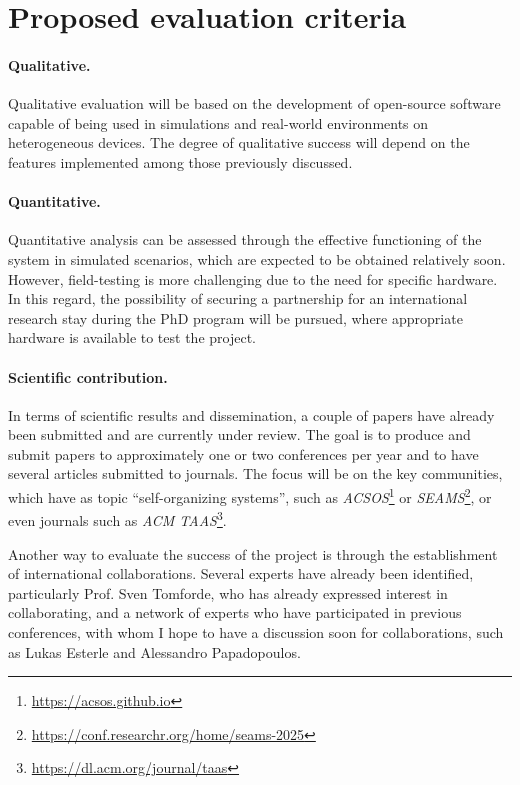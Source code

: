 \documentclass[12pt, a4paper]{article}
\begin{document}
\section{Proposed evaluation criteria}
\label{sec:proposed-evaluation-criteria}

\sloppypar
\paragraph{Qualitative.}
Qualitative evaluation will be based on the development of open-source software capable of being used in simulations and real-world
environments on heterogeneous devices.
%
The degree of qualitative success will depend on the features implemented among those previously discussed.

\sloppypar
\paragraph{Quantitative.}
Quantitative analysis can be assessed through the effective functioning of the system in simulated scenarios,
which are expected to be obtained relatively soon.
%
However,
field-testing is more challenging due to the need for specific hardware.
%
In this regard,
the possibility of securing a partnership for an international research stay during the PhD program will be pursued,
where appropriate hardware is available to test the project.

\sloppypar
\paragraph{Scientific contribution.}
In terms of scientific results and dissemination,
a couple of papers have already been submitted and are currently under review.
%
The goal is to produce and submit papers to approximately one or two conferences per year and to have several articles submitted to journals.
%
The focus will be on the key communities, which have as topic ``self-organizing systems'',
such as \emph{ACSOS}\footnote{\url{https://acsos.github.io}} or \emph{SEAMS}\footnote{\url{https://conf.researchr.org/home/seams-2025}},
or even journals such as \emph{ACM TAAS}\footnote{\url{https://dl.acm.org/journal/taas}}.

Another way to evaluate the success of the project is through the establishment of international collaborations.
%
Several experts have already been identified,
particularly Prof. Sven Tomforde,
who has already expressed interest in collaborating,
and a network of experts who have participated in previous conferences,
with whom I hope to have a discussion soon for collaborations,
such as Lukas Esterle and Alessandro Papadopoulos.







\end{document}
